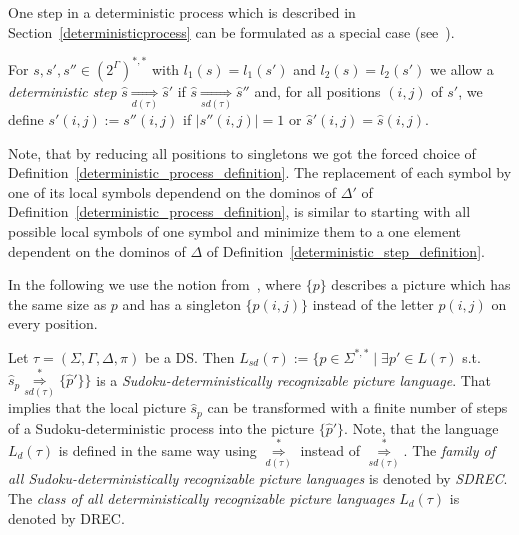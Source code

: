 One step in a deterministic process which is described in Section~\ref{deterministicprocess}
can be formulated as a special case (see~\cite{borchert2006deterministically}).
\begin{definition}
For $s, s', s'' \in (2^\Gamma)^{*,*}$ with $l_1(s) = l_1(s')$ and $l_2(s) = l_2(s')$ we allow a
\emph{deterministic step} $\hat{s} \underset{d(\tau)}{\Rightarrow} \hat{s}'$ if $\hat{s}
\underset{sd(\tau)}{\Rightarrow} \hat{s}''$ and, for all positions $(i, j)$ of $s'$, we define
$s'(i, j) := s''(i, j)$ if $\left| s''(i, j) \right| = 1$ or $\hat{s}'(i, j) = \hat{s}(i, j)$.
\label{deterministic_step_definition}
\end{definition}
Note, that by reducing all positions to singletons we got the forced choice of
Definition~\ref{deterministic_process_definition}. The replacement of each symbol by one of its
local symbols dependend on the dominos of $\Delta'$ of
Definition~\ref{deterministic_process_definition}, is similar to starting with all possible local
symbols of one symbol and minimize them to a one element dependent on the dominos of $\Delta$ of 
Definition~\ref{deterministic_step_definition}.

In the following we use the notion from~\cite{borchert2006deterministically}, where $\{p\}$
describes a picture which has the same size as $p$ and has a singleton $\{p(i, j)\}$ instead of
the letter $p(i, j)$ on every position.

Let $\tau = (\Sigma, \Gamma, \Delta, \pi)$ be a DS. Then $L_{sd}(\tau) := \{p \in \Sigma^{*,*}
\mid \exists p' \in L(\tau)$ s.t.
$\hat{s}_p \overset{*}{\underset{sd(\tau)}{\Rightarrow}} \{\hat{p}'\}\}$ is a
\emph{Sudoku-deterministically recognizable picture language}.
That implies that the local picture $\hat{s}_p$ can be transformed with a finite number of steps of
a Sudoku-deterministic process into the picture $\{\hat{p}'\}$. Note, that the language
$L_{d}(\tau)$ is defined in the same way using $\overset{*}{\underset{d(\tau)}{\Rightarrow}}$ instead of
$\overset{*}{\underset{sd(\tau)}{\Rightarrow}}$. The \emph{family of all Sudoku-deterministically
recognizable picture languages} is denoted by \emph{SDREC}. The \emph{class of all
deterministically recognizable picture languages} $L_d(\tau)$ is denoted by DREC.

